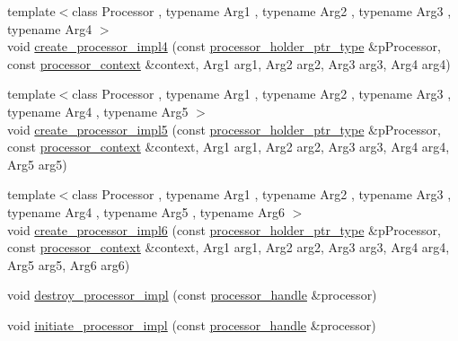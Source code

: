 \begin{DoxyCompactItemize}
\item 
{\footnotesize template$<$class Processor , typename Arg1 , typename Arg2 , typename Arg3 , typename Arg4 $>$ }\\void \mbox{\hyperlink{classboost_1_1statechart_1_1processor__container_a4e8370ed263cc0a9546117e065744fac}{create\+\_\+processor\+\_\+impl4}} (const \mbox{\hyperlink{classboost_1_1statechart_1_1processor__container_a885e5a42694857bfaa44ec053ed20a57}{processor\+\_\+holder\+\_\+ptr\+\_\+type}} \&p\+Processor, const \mbox{\hyperlink{classboost_1_1statechart_1_1processor__container_1_1processor__context}{processor\+\_\+context}} \&context, Arg1 arg1, Arg2 arg2, Arg3 arg3, Arg4 arg4)
\item 
{\footnotesize template$<$class Processor , typename Arg1 , typename Arg2 , typename Arg3 , typename Arg4 , typename Arg5 $>$ }\\void \mbox{\hyperlink{classboost_1_1statechart_1_1processor__container_a98a9336053bc06d3486464e98f997b64}{create\+\_\+processor\+\_\+impl5}} (const \mbox{\hyperlink{classboost_1_1statechart_1_1processor__container_a885e5a42694857bfaa44ec053ed20a57}{processor\+\_\+holder\+\_\+ptr\+\_\+type}} \&p\+Processor, const \mbox{\hyperlink{classboost_1_1statechart_1_1processor__container_1_1processor__context}{processor\+\_\+context}} \&context, Arg1 arg1, Arg2 arg2, Arg3 arg3, Arg4 arg4, Arg5 arg5)
\item 
{\footnotesize template$<$class Processor , typename Arg1 , typename Arg2 , typename Arg3 , typename Arg4 , typename Arg5 , typename Arg6 $>$ }\\void \mbox{\hyperlink{classboost_1_1statechart_1_1processor__container_a14c516cb9fc15473920d5a5d79ee95db}{create\+\_\+processor\+\_\+impl6}} (const \mbox{\hyperlink{classboost_1_1statechart_1_1processor__container_a885e5a42694857bfaa44ec053ed20a57}{processor\+\_\+holder\+\_\+ptr\+\_\+type}} \&p\+Processor, const \mbox{\hyperlink{classboost_1_1statechart_1_1processor__container_1_1processor__context}{processor\+\_\+context}} \&context, Arg1 arg1, Arg2 arg2, Arg3 arg3, Arg4 arg4, Arg5 arg5, Arg6 arg6)
\item 
void \mbox{\hyperlink{classboost_1_1statechart_1_1processor__container_a50b4db6dac9debb3b9e9e50f25af74f3}{destroy\+\_\+processor\+\_\+impl}} (const \mbox{\hyperlink{classboost_1_1statechart_1_1processor__container_a82ebbffaed81d7b99119ae0e892f6411}{processor\+\_\+handle}} \&processor)
\item 
void \mbox{\hyperlink{classboost_1_1statechart_1_1processor__container_a990121e1344fde3e2b3735c7364805f9}{initiate\+\_\+processor\+\_\+impl}} (const \mbox{\hyperlink{classboost_1_1statechart_1_1processor__container_a82ebbffaed81d7b99119ae0e892f6411}{processor\+\_\+handle}} \&processor)

\end{DoxyCompactItemize}
